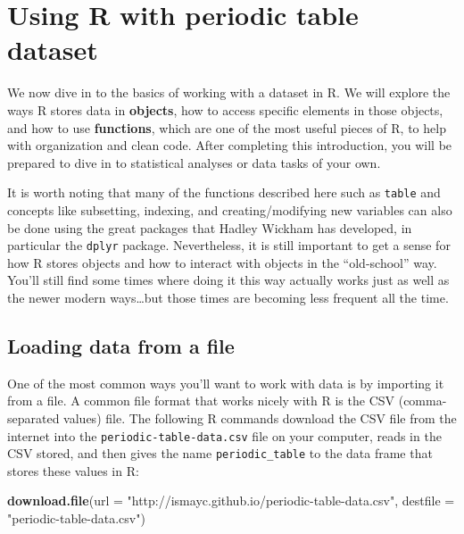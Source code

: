 \documentclass[]{tufte-book}
\newenvironment{Shaded}{\begin{snugshade}}{\end{snugshade}}
\newcommand{\AttributeTok}[1]{\textcolor[rgb]{0.13,0.29,0.53}{#1}}
\newcommand{\FunctionTok}[1]{\textcolor[rgb]{0.13,0.29,0.53}{\textbf{#1}}}
\newcommand{\NormalTok}[1]{#1}
\newcommand{\StringTok}[1]{\textcolor[rgb]{0.31,0.60,0.02}{#1}}
\begin{document}
\section{Using R with periodic table dataset}\label{using-r-with-periodic-table-dataset}

We now dive in to the basics of working with a dataset in R. We will explore the ways R stores data in \textbf{objects}, how to access specific elements in those objects, and how to use \textbf{functions}, which are one of the most useful pieces of R, to help with organization and clean code. After completing this introduction, you will be prepared to dive in to statistical analyses or data tasks of your own.

It is worth noting that many of the functions described here such as \texttt{table} and concepts like subsetting, indexing, and creating/modifying new variables can also be done using the great packages that Hadley Wickham has developed, in particular the \texttt{dplyr} package. Nevertheless, it is still important to get a sense for how R stores objects and how to interact with objects in the ``old-school'' way. You'll still find some times where doing it this way actually works just as well as the newer modern ways\ldots but those times are becoming less frequent all the time.

\subsection{Loading data from a file}\label{loading-data-from-a-file}

One of the most common ways you'll want to work with data is by importing it from a file. A common file format that works nicely with R is the CSV (comma-separated values) file. The following R commands download the CSV file from the internet into the \texttt{periodic-table-data.csv} file on your computer, reads in the CSV stored, and then gives the name \texttt{periodic\_table} to the data frame that stores these values in R:

\begin{Shaded}
\begin{Highlighting}[]
\FunctionTok{download.file}\NormalTok{(}\AttributeTok{url =} \StringTok{"http://ismayc.github.io/periodic{-}table{-}data.csv"}\NormalTok{,}
 \AttributeTok{destfile =} \StringTok{"periodic{-}table{-}data.csv"}\NormalTok{)}
\end{Highlighting}
\end{Shaded}
\end{document}
